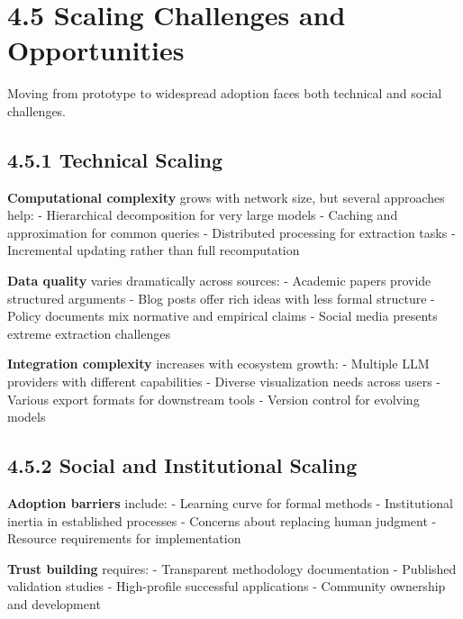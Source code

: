 \documentclass[
  11pt,
  letterpaper,
]{book}
\begin{document}
\section*{4.5 Scaling Challenges and Opportunities}\label{sec-scaling}


Moving from prototype to widespread adoption faces both technical and
social challenges.

\subsection*{4.5.1 Technical Scaling}\label{sec-technical-scaling}

\textbf{Computational complexity} grows with network size, but several
approaches help: - Hierarchical decomposition for very large models -
Caching and approximation for common queries - Distributed processing
for extraction tasks - Incremental updating rather than full
recomputation

\textbf{Data quality} varies dramatically across sources: - Academic
papers provide structured arguments - Blog posts offer rich ideas with
less formal structure - Policy documents mix normative and empirical
claims - Social media presents extreme extraction challenges

\textbf{Integration complexity} increases with ecosystem growth: -
Multiple LLM providers with different capabilities - Diverse
visualization needs across users - Various export formats for downstream
tools - Version control for evolving models

\subsection*{4.5.2 Social and Institutional
Scaling}\label{sec-social-scaling}

\textbf{Adoption barriers} include: - Learning curve for formal methods
- Institutional inertia in established processes - Concerns about
replacing human judgment - Resource requirements for implementation

\textbf{Trust building} requires: - Transparent methodology
documentation - Published validation studies - High-profile successful
applications - Community ownership and development
\end{document}
